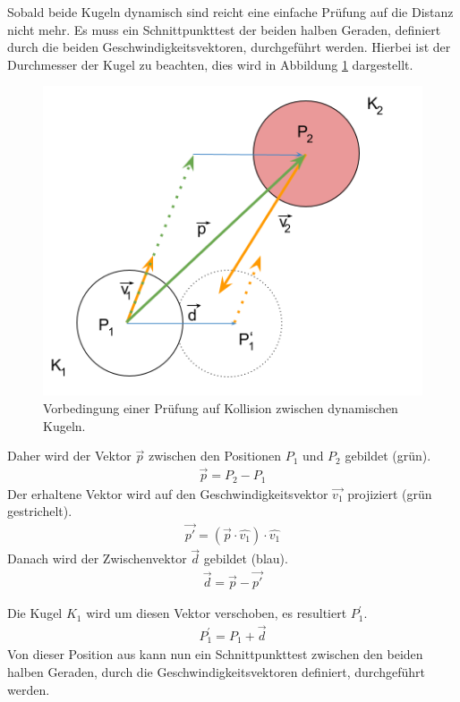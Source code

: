 Sobald beide Kugeln dynamisch sind reicht eine einfache Prüfung auf die Distanz nicht mehr. Es muss ein Schnittpunkttest der beiden halben Geraden, definiert durch die
beiden Geschwindigkeitsvektoren, durchgeführt werden. Hierbei ist der Durchmesser der Kugel zu beachten, dies
wird in Abbildung \ref{fig:kugelkollision_vorbedingung_dynamisch} dargestellt.
\begin{figure}[h!]
    \begin{center}
        \includegraphics[width=0.4\linewidth]{../common/03_billiard_ai/resources/25_vorbedingung_kugelkollision_dynamisch.png}
    \end{center}
    \caption{Vorbedingung einer Prüfung auf Kollision zwischen dynamischen Kugeln.}
    \label{fig:kugelkollision_vorbedingung_dynamisch}
\end{figure}

Daher wird der Vektor $\vec{p}$ zwischen den Positionen $P_1$ und $P_2$ gebildet (grün).
\begin{align}
    \vec{p} = P_2 - P_1
\end{align}
Der erhaltene Vektor wird auf den Geschwindigkeitsvektor $\vec{v_1}$ projiziert (grün gestrichelt).
\begin{align}
    \vec{p'} = (\vec{p} \cdot \hat{v_1}) \cdot \hat{v_1}
\end{align}
Danach wird der Zwischenvektor $\vec{d}$ gebildet (blau).
\begin{align}
    \vec{d} = \vec{p} - \vec{p'}
\end{align}

Die Kugel $K_1$ wird um diesen Vektor verschoben, es resultiert $P^{'}_1$.
\begin{align}
    P^{'}_1 = P_1 + \vec{d}
\end{align}
Von dieser Position aus kann nun ein Schnittpunkttest zwischen den beiden
halben Geraden, durch die Geschwindigkeitsvektoren definiert, durchgeführt werden.

